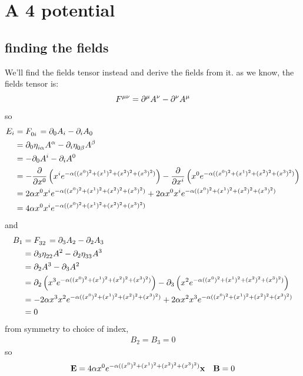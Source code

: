 \clearpage
\section{A 4 potential}
\subsection{finding the fields}\label{q2s1}
We'll find the fields tensor instead and derive the fields from it. as we know, the fields tensor is:
\begin{equation}
  \tensor{F}{^\mu^\nu} = \partial^\mu A^\nu-\partial^\nu A^\mu
\end{equation}
so
\begin{align}
  E_i &= \tensor{F}{_0_i}=\partial_0A_i-\partial_iA_0\\
  &= \partial_0\tensor{\eta}{_i_\alpha}A^\alpha-\partial_i\tensor{\eta}{_0_\beta}A^\beta\\
  &= -\partial_0A^i-\partial_iA^0\\
  &= -\diffp*{\ins{x^i e^{-\alpha((x^0)^2+(x^1)^2+(x^2)^2+(x^3)^2)}}}{x^0}-\diffp*{\ins{x^0 e^{-\alpha((x^0)^2+(x^1)^2+(x^2)^2+(x^3)^2)}}}{x^i}\\
  &= 2\alpha x^0x^ie^{-\alpha((x^0)^2+(x^1)^2+(x^2)^2+(x^3)^2)}+2\alpha x^0x^ie^{-\alpha((x^0)^2+(x^1)^2+(x^2)^2+(x^3)^2)}\\
  &= 4\alpha x^0x^ie^{-\alpha((x^0)^2+(x^1)^2+(x^2)^2+(x^3)^2)}
\end{align}
and
\begin{align}
	B_1 &= \tensor{F}{_3_2} = \partial_3A_2-\partial_2A_3\\
	&= \partial_3\tensor{\eta}{_2_2}A^2-\partial_2\tensor{\eta}{_3_3}A^3\\
	&= \partial_2A^3-\partial_3A^2\\
	&= \partial_2\ins{x^3e^{-\alpha((x^0)^2+(x^1)^2+(x^2)^2+(x^3)^2)}}-\partial_3\ins{x^2e^{-\alpha((x^0)^2+(x^1)^2+(x^2)^2+(x^3)^2)}}\\
	&= -2\alpha x^3x^2e^{-\alpha((x^0)^2+(x^1)^2+(x^2)^2+(x^3)^2)}+2\alpha x^2x^3e^{-\alpha((x^0)^2+(x^1)^2+(x^2)^2+(x^3)^2)}\\
	&= 0
\end{align}
from symmetry to choice of index,
\begin{align}
	B_2=B_3=0
\end{align}
so
\begin{align}
	\bold E=4\alpha x^0e^{-\alpha((x^0)^2+(x^1)^2+(x^2)^2+(x^3)^2)}\bold x && \bold B=0
\end{align}
